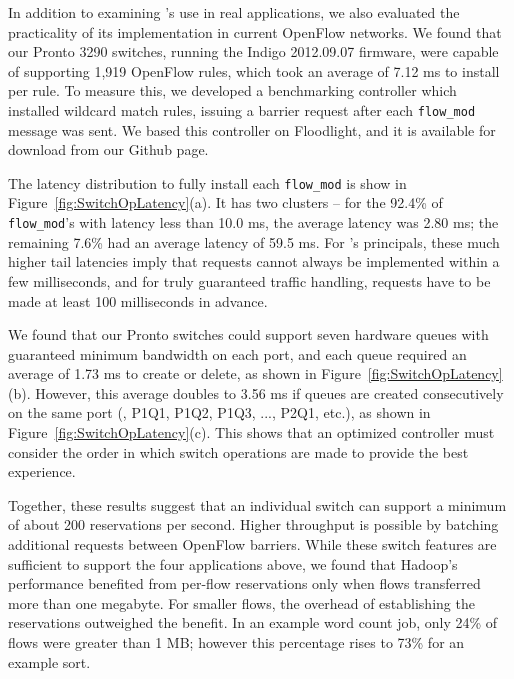 In addition to examining \sys's use in real applications, we also evaluated
the practicality of its implementation in current OpenFlow networks.
We found that our Pronto 3290 switches, running the Indigo 2012.09.07
firmware, were capable of supporting 1,919 OpenFlow rules, which took
an average of 7.12 ms to install per rule. To measure this, we developed a
benchmarking controller which installed wildcard match rules, issuing
a barrier request after each \verb/flow_mod/ message was sent. We based this
controller on Floodlight, and it is available for download from our Github page.

The latency distribution to fully install each \verb/flow_mod/ is show in
Figure~\ref{fig:SwitchOpLatency}(a). It has two clusters -- for the 92.4\% of
\verb/flow_mod/'s with latency less than 10.0 ms, the average latency
was 2.80 ms; the remaining 7.6\% had an average latency of 59.5 ms.
For \sys's principals, these much higher tail latencies imply that requests
cannot always be implemented within a few milliseconds, and for truly
guaranteed traffic handling, requests have to be made at least 100
milliseconds in advance.

We found that our Pronto switches could support seven hardware
queues with guaranteed minimum bandwidth on each port, and each
queue required an average of 1.73 ms to create or delete, as shown in
Figure~\ref{fig:SwitchOpLatency}(b). However, this average doubles to 3.56 ms
if queues are created consecutively on the same port (\ie, P1Q1, P1Q2,
P1Q3, ..., P2Q1, etc.), as shown in Figure~\ref{fig:SwitchOpLatency}(c).
This shows that an optimized \sys controller must consider the order in
which switch operations are made to provide the best experience.%

Together, these results suggest that an
individual switch can support a minimum of about 200 reservations
per second. Higher throughput is possible by batching additional requests
between OpenFlow barriers.
While these switch features are sufficient to support the four applications
above, we found that Hadoop's performance benefited from per-flow
reservations only when flows transferred more than one megabyte. For
smaller flows, the overhead of establishing the reservations outweighed
the benefit.
In an example word count job, only 24\% of flows were greater
than 1 MB; however this percentage rises to 73\% for an example sort.
